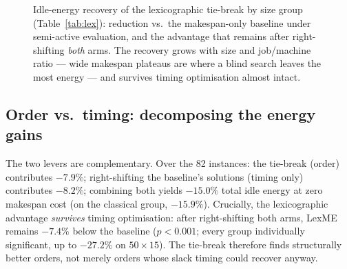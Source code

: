\documentclass[preprint,12pt]{elsarticle}
\begin{document}
\begin{figure}[htb]
\centering
{}
\caption{Idle-energy recovery of the lexicographic tie-break by size group
(Table~\ref{tab:lex}): reduction vs.\ the makespan-only baseline under
semi-active evaluation, and the advantage that remains after right-shifting
\emph{both} arms. The recovery grows with size and job/machine ratio ---
wide makespan plateaus are where a blind search leaves the most energy ---
and survives timing optimisation almost intact.}
\label{fig:lexbars}
\end{figure}

\subsection{Order vs.\ timing: decomposing the energy gains}
\label{sec:exp-decomp}

The two levers are complementary. Over the 82 instances: the tie-break
(order) contributes $-7.9\%$; right-shifting the baseline's solutions
(timing only) contributes $-8.2\%$; combining both yields
$\mathbf{-15.0\%}$ total idle energy at zero makespan cost (on the
classical group, $-15.9\%$). Crucially, the lexicographic advantage
\emph{survives} timing optimisation: after right-shifting both arms, LexME
remains $-7.4\%$ below the baseline ($p<0.001$; every group individually
significant, up to $-27.2\%$ on $50{\times}15$). The tie-break therefore
finds structurally better orders, not merely orders whose slack timing
could recover anyway.
\end{document}
